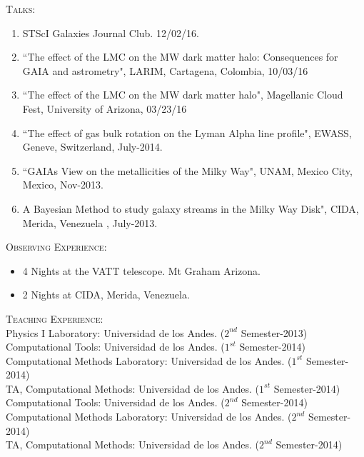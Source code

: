 \documentclass[letterpaper]{article}
\begin{document}
\textsc{\Large Talks:}\\
\begin{enumerate}
\setlength\itemsep{0em}
\item STScI Galaxies Journal Club. 12/02/16.\\
\item ``The effect of the LMC on the MW dark matter halo:
Consequences for GAIA and astrometry", LARIM, Cartagena, Colombia,
10/03/16
\item ``The effect of the LMC on the MW dark matter halo", Magellanic Cloud Fest, 
University of Arizona, 03/23/16\\
\item ``The effect of gas bulk rotation on the Lyman Alpha line profile", EWASS, Geneve, Switzerland, July-2014.\\
\item ``GAIAs View on the metallicities of the Milky Way", UNAM, Mexico City, Mexico, Nov-2013. \\
\item A Bayesian Method to study galaxy streams in the Milky Way Disk", CIDA, Merida, Venezuela , July-2013.\\
\end{enumerate}

\textsc{\Large Observing Experience:}\\
\begin{itemize}
\item{4 Nights at the VATT telescope. Mt Graham Arizona.}
\item{2 Nights at CIDA, Merida, Venezuela.}
\end{itemize}


\textsc{\Large Teaching Experience:}\\

Physics I Laboratory: Universidad de los Andes. \indent ($2^{nd}$
Semester-2013)\\
\indent Computational Tools: Universidad de los Andes. \indent
($1^{st}$ Semester-2014)\\
\indent Computational Methods Laboratory: Universidad de los Andes.
\indent ($1^{st}$ Semester-2014)\\
\indent TA, Computational Methods: Universidad de los Andes. \indent
($1^{st}$ Semester-2014)\\
\indent Computational Tools: Universidad de los Andes. \indent
($2^{nd}$ Semester-2014)\\
\indent Computational Methods Laboratory: Universidad de los Andes.
\indent ($2^{nd}$ Semester-2014)\\
\indent TA, Computational Methods: Universidad de los Andes. \indent
($2^{nd}$ Semester-2014)\\
\end{document}
